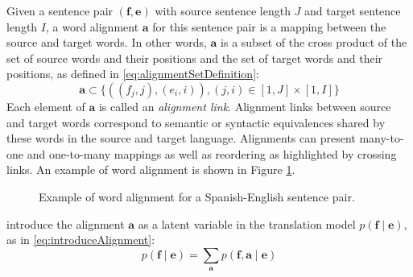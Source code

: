Given a sentence pair $(\bm{f}, \bm{e})$ with source sentence
length $J$ and target sentence length $I$, a word alignment $\bm{a}$
for this sentence pair is a mapping between the source and target
words. In other words, $\bm{a}$ is a subset of the cross product
of the set of source words and their positions and the set of target
words and their positions, as defined in \autoref{eq:alignmentSetDefinition}:
%
\begin{equation}
  \bm{a} \subset \{((f_j, j), (e_i, i)), (j, i) \in [1, J] \times [1, I]\}
  \label{eq:alignmentSetDefinition}
\end{equation}
%
Each element of $\bm{a}$ is called an \emph{alignment link}.
Alignment links between source and target words
correspond to semantic or syntactic equivalences shared by these words in the
source and target language. Alignments can present many-to-one and one-to-many
mappings as well as reordering as highlighted by crossing links. An example
of word alignment is
shown in Figure \ref{fig:examplealign}.
%
\begin{figure}
  \begin{center}
  \end{center}
  \caption{Example of word alignment for a Spanish-English sentence pair.}
  \label{fig:examplealign}
\end{figure}
%
\citet{brown-dellapietra-dellapietra-mercer-1993} introduce the
alignment $\bm{a}$ as a latent variable in the translation model
$p(\bm{f} \mid \bm{e})$, as in \autoref{eq:introduceAlignment}:
\begin{equation}
  p(\bm{f} \mid \bm{e}) = \sum_{\bm{a}} p(\bm{f}, \bm{a} \mid \bm{e})
  \label{eq:introduceAlignment}
\end{equation}
